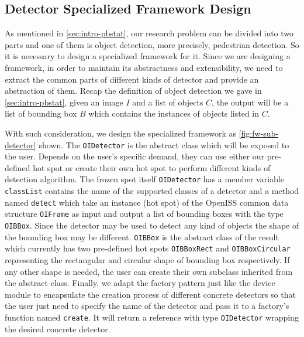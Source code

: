 \subsection{Detector Specialized Framework Design}
\label{sec:fw-design-spec-detector}

As mentioned in \autoref{sec:intro-pbstat}, our research problem can be divided
into two parts and one of them is object detection, more precisely, pedestrian
detection. So it is necessary to design a specialized framework for it. Since
we are designing a framework, in order to maintain its abstractness and
extensibility, we need to extract the common parts of different kinds of
detector and provide an abstraction of them.
Recap the definition of object detection we gave in \autoref{sec:intro-pbstat},
given an image $I$ and a list of objects $C$, the output will be a list of
bounding box $B$ which contains the instances of objects listed in $C$.

With such consideration, we design the specialized framework as
\autoref{fig:fw-sub-detector} shown. The \texttt{OIDetector} is the abstract
class which will be exposed to the user. Depends on the user's specific demand,
they can use either our pre-defined hot spot or create their own hot spot to
perform different kinds of detection algorithm. The frozen spot itself
\texttt{OIDetector} has a member variable \texttt{classList} contains the name
of the supported classes of a detector and a method named \texttt{detect} which
take an instance (hot spot) of the OpenISS common data structure
\texttt{OIFrame} as input and output a list of bounding boxes with the type
\texttt{OIBBox}.
Since the detector may be used to detect any kind of objects the shape of the
bounding box may be different. \texttt{OIBBox} is the abstract class of the
result which currently has two pre-defined hot spots \texttt{OIBBoxRect} and
\texttt{OIBBoxCircular} representing the rectangular and circular shape of
bounding box respectively. If any other shape is needed, the user can create
their own subclass inherited from the abstract class.
Finally, we adapt the factory pattern just like the device module to
encapsulate the creation process of different concrete detectors so that
the user just need to specify the name of the detector and pass it to a
factory's function named \texttt{create}. It will return a reference with type
\texttt{OIDetector} wrapping the desired concrete detector.

